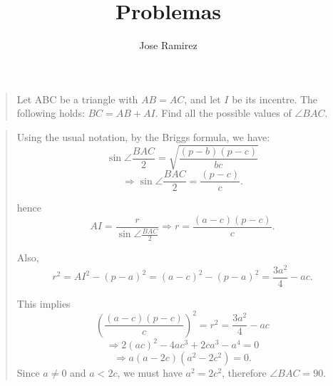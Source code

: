 \documentclass[12pt,letterpaper,draft,oneside,onecolumn,titlepage]{article}
\author{Jose Ramirez}
\title{Problemas}
\begin{document}
	\begin{quotation}
		Let ABC be a triangle with $AB=AC$, and let $I$  be its incentre. The following
		holds: $BC=AB+AI$. Find all the possible values of $\angle BAC$.	
	\end{quotation}
	\begin{quotation}
		Using the usual notation, by the Briggs formula, we have:
		$$\sin \angle \frac{BAC}{2}=\sqrt{\frac{(p-b)(p-c)}{bc}} $$
		$$\Rightarrow \sin \angle \frac{BAC}{2}=\frac{(p-c)}{c}.$$

		hence $$AI=\frac{r}{\sin \angle \frac{BAC}{2}} \Rightarrow r=\frac{(a-c)(p-c)}{c}.$$

		Also, $$ r^2 = AI^2 - (p-a)^2 = (a-c)^2 - (p-a)^2 = \frac{3a^2}{4} - ac.$$

		This implies 	$$\left(\frac{(a-c)(p-c)}{c}\right)^2 = r^2 = \frac{3a^2}{4} - ac$$ 
						$$\Rightarrow 2(ac)^2 - 4ac^3 + 2ca^3 - a^4 = 0$$
						$$ \Rightarrow a(a-2c)(a^2-2c^2) = 0.$$
		Since $a\not=0$ and $a<2c$, we must have $a^2=2c^2$, therefore $\angle BAC=90$.
	\end{quotation}
\end{document}
